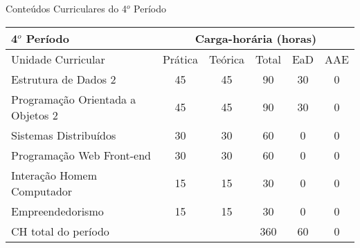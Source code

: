 \begin{quadro}[ht!]
\centering
\caption{Conteúdos Curriculares do 4$^o$ Período}\label{qua:periodo4}
\begin{tabular}{|p{8.0cm}|c|c|c|c|c|}
\hline
\rowcolor{blue1} 4$^o$ Período & \multicolumn{5}{|c|}{\centering Carga-horária (horas)} \\ \hline
\rowcolor{blue1} Unidade Curricular & Prática & Teórica & Total & EaD & AAE \\ \hline
Estrutura de Dados 2 & 45 & 45 & 90 & 30	&	0 \\	\hline
Programação Orientada a Objetos 2 & 45 & 45 & 90 & 30	&	0 \\	\hline
Sistemas Distribuídos & 30 & 30 & 60 & 0	&	0 \\	\hline
Programação Web Front-end & 30 & 30 & 60 & 0	&	0 \\	\hline
Interação Homem Computador & 15 & 15 & 30 & 0	&	0 \\	\hline
Empreendedorismo & 15 & 15 & 30 & 0	&	0 \\	\hline
CH total do período & \multicolumn{2}{p{3.3cm}|}{\cellcolor{blue1}} & 360 & 60	&	0 \\ \hline
\end{tabular} \end{quadro}